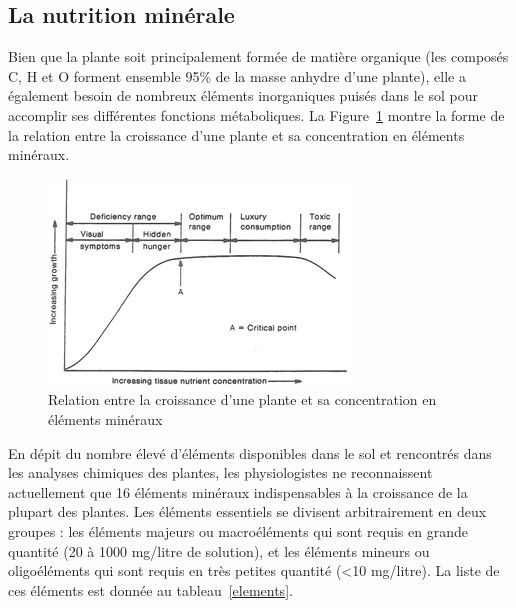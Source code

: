 \subsection{La nutrition minérale}

Bien que la plante soit principalement formée de matière organique (les composés C, H et O forment ensemble 95\% de la masse anhydre d'une plante), elle a également besoin de nombreux éléments inorganiques puisés dans le sol pour accomplir ses différentes fonctions métaboliques. La Figure~\ref{mineraux} montre la forme de la relation entre la croissance d'une plante et sa concentration en éléments minéraux. 

\begin{figure}[h]
\centering
\includegraphics[scale=1]{img/ch2_nutr_min}
\caption{Relation entre la croissance d'une plante et sa concentration en éléments minéraux \citep{landis1989container}}
\label{mineraux}
\end{figure}

En dépit du nombre élevé d'éléments disponibles dans le sol et rencontrés dans les analyses chimiques des plantes, les physiologistes ne reconnaissent actuellement que 16 éléments minéraux indispensables à la croissance de la plupart des plantes. Les éléments essentiels se divisent arbitrairement en deux groupes : les éléments majeurs ou macroéléments qui sont requis en grande quantité (20 à 1000 mg/litre de solution), et les éléments mineurs ou oligoéléments qui sont requis en très petites quantité (<10 mg/litre). La liste de ces éléments est donnée au tableau~\ref{elements}. 


